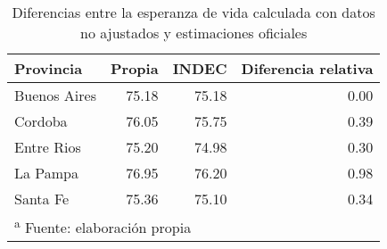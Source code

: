 \documentclass[12pt,]{article}
\begin{document}
\begin{table}

\caption{\label{tab:Dif_e0_INDEC}Diferencias entre la esperanza de vida calculada con datos no ajustados y estimaciones oficiales}
\centering
\begin{tabular}[t]{l|r|r|r}
\hline
Provincia & Propia & INDEC & Diferencia relativa\\
\hline
Buenos Aires & 75.18 & 75.18 & 0.00\\
\hline
Cordoba & 76.05 & 75.75 & 0.39\\
\hline
Entre Rios & 75.20 & 74.98 & 0.30\\
\hline
La Pampa & 76.95 & 76.20 & 0.98\\
\hline
Santa Fe & 75.36 & 75.10 & 0.34\\
\hline
\multicolumn{4}{l}{\textsuperscript{a} Fuente: elaboración propia}\\
\end{tabular}
\end{table}
\end{document}
